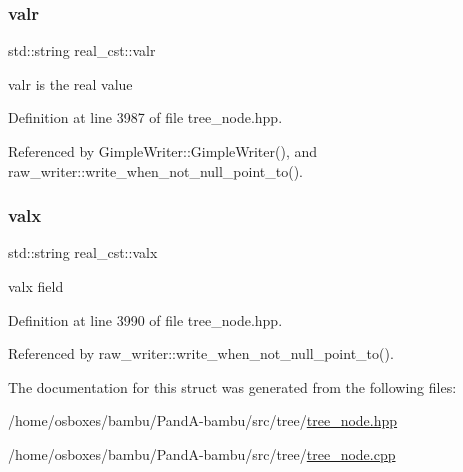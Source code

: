\subsubsection{\texorpdfstring{valr}{valr}}
{\footnotesize\ttfamily std\+::string real\+\_\+cst\+::valr}



valr is the real value 



Definition at line 3987 of file tree\+\_\+node.\+hpp.



Referenced by Gimple\+Writer\+::\+Gimple\+Writer(), and raw\+\_\+writer\+::write\+\_\+when\+\_\+not\+\_\+null\+\_\+point\+\_\+to().

\mbox{\label{structreal__cst_a75735bcb8dcc50f7c237a5daa7a1dffc}} 
\subsubsection{\texorpdfstring{valx}{valx}}
{\footnotesize\ttfamily std\+::string real\+\_\+cst\+::valx}



valx field 



Definition at line 3990 of file tree\+\_\+node.\+hpp.



Referenced by raw\+\_\+writer\+::write\+\_\+when\+\_\+not\+\_\+null\+\_\+point\+\_\+to().



The documentation for this struct was generated from the following files\+:\begin{DoxyCompactItemize}
\item 
/home/osboxes/bambu/\+Pand\+A-\/bambu/src/tree/\hyperlink{tree__node_8hpp}{tree\+\_\+node.\+hpp}\item 
/home/osboxes/bambu/\+Pand\+A-\/bambu/src/tree/\hyperlink{tree__node_8cpp}{tree\+\_\+node.\+cpp}\end{DoxyCompactItemize}
